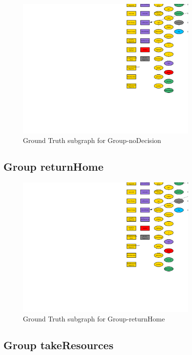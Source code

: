 \documentclass{article}%
\begin{document}
\begin{figure}[ht]%
\centering%
\includegraphics[width=0.8\textwidth]{images/Group-noDecision.png}%
\caption{Ground Truth subgraph for Group{-}noDecision}%
\end{figure}

%
\subsection{Group returnHome}%
\label{subsec:Group returnHome}%


\begin{figure}[ht]%
\centering%
\includegraphics[width=0.8\textwidth]{images/Group-returnHome.png}%
\caption{Ground Truth subgraph for Group{-}returnHome}%
\end{figure}

%
\subsection{Group takeResources}%
\label{subsec:Group takeResources}%
\end{document}
